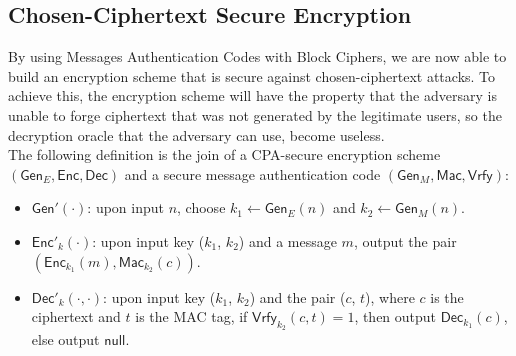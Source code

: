 \subsection{Chosen-Ciphertext Secure Encryption}
By using Messages Authentication Codes with Block Ciphers, we are now able to build an encryption scheme that is secure against chosen-ciphertext attacks. To achieve this, the encryption scheme will have the property that the adversary is unable to forge ciphertext that was not generated by the legitimate users, so the decryption oracle that the adversary can use, become useless.\\
The following definition is the join of a CPA-secure encryption scheme $(\mathsf{Gen}_E,\mathsf{Enc},\mathsf{Dec})$ and a secure message authentication code $(\mathsf{Gen}_M, \mathsf{Mac}, \mathsf{Vrfy})$:
\begin{itemize}
    \item{$\mathsf{Gen}'(\cdot)$: upon input $n$, choose $k_1 \leftarrow \mathsf{Gen}_E(n)$ and $k_2 \leftarrow \mathsf{Gen}_M(n)$.}
    \item{$\mathsf{Enc}'_k(\cdot)$: upon input key ($k_1$, $k_2$) and a message $m$, output the pair $(\mathsf{Enc}_{k_1}(m), \mathsf{Mac}_{k_2}(c))$.}
    \item{$\mathsf{Dec}'_k(\cdot, \cdot)$: upon input key ($k_1$, $k_2$) and the pair ($c$, $t$), where $c$ is the ciphertext and $t$ is the MAC tag, if $\mathsf{Vrfy}_{k_2}(c, t) = 1$, then output $\mathsf{Dec}_{k_1}(c)$, else output $\mathsf{null}$.}
\end{itemize}
